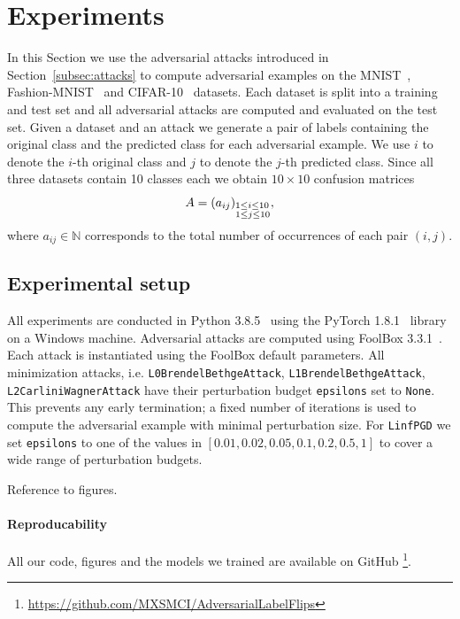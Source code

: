\documentclass{article}
\begin{document}
\section{Experiments}
\label{sec:experiments}

In this Section we use the adversarial attacks introduced in Section~\ref{subsec:attacks} to compute adversarial examples on the MNIST~\cite{deng2012mnist}, Fashion-MNIST~\cite{xiao2017fashion} and CIFAR-10~\cite{krizhevsky2009learning} datasets. Each dataset is split into a training and test set and all adversarial attacks are computed and evaluated on the test set. Given a dataset and an attack we generate a pair of labels containing the original class and the predicted class for each adversarial example. We use $i$ to denote the $i$-th original class and $j$ to denote the $j$-th predicted class. Since all three datasets contain 10 classes each we obtain $10\times10$ confusion matrices
\[A=(a_{ij})_{\begin{subarray}{l} 1\le i\le 10 \\ 1\le j\le 10\end{subarray}},\]
where $a_{ij}\in\mathbb{N}$ corresponds to the total number of occurrences of each pair $(i,j)$.


\subsection{Experimental setup}
All experiments are conducted in Python 3.8.5~\cite{van1995python} using the PyTorch 1.8.1~\cite{pytorch} library on a Windows machine. Adversarial attacks are computed using FoolBox 3.3.1~\cite{rauber2017foolbox}. Each attack is instantiated using the FoolBox default parameters. All minimization attacks, i.e. \texttt{L0BrendelBethgeAttack}, \texttt{L1BrendelBethgeAttack}, \texttt{L2CarliniWagnerAttack} have their perturbation budget \texttt{epsilons} set to \texttt{None}. This prevents any early termination; a fixed number of iterations is used to compute the adversarial example with minimal perturbation size. For \texttt{LinfPGD} we set \texttt{epsilons} to one of the values in $[0.01, 0.02, 0.05, 0.1, 0.2, 0.5, 1]$ to cover a wide range of perturbation budgets.

\noindent Reference to figures.

\paragraph{Reproducability}All our code, figures and the models we trained are available on GitHub \footnote{\url{https://github.com/MXSMCI/AdversarialLabelFlips}}.
\end{document}
